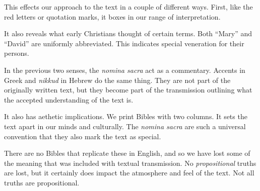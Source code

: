 \documentclass[aspectratio=169]{beamer}
\begin{document}
\begin{frame}
  This effects our approach to the text in a couple of different ways.
  First, like the red letters or quotation marks, it boxes in our range of interpretation.
\end{frame}

\begin{frame}
  It also reveals what early Christians thought of certain terms.
  Both ``Mary'' and ``David'' are uniformly abbreviated.
  This indicates special veneration for their persons.
\end{frame}

\begin{frame}
  In the previous two senses, the \emph{nomina sacra} act as a commentary.
  Accents in Greek and \emph{nikkud} in Hebrew do the same thing.
  They are not part of the originally written text, but they become part of the transmission outlining what the accepted understanding of the text is.
\end{frame}

\begin{frame}
  It also has aethetic implications.
  We print Bibles with two columns.
  It sets the text apart in our minds and culturally.
  The \emph{nomina sacra} are such a universal convention that they also mark the text as special.
\end{frame}

\begin{frame}
  There are no Bibles that replicate these in English, and so we have lost some of the meaning that was included with textual transmission.
  No \emph{propositional} truths are lost, but it certainly does impact the atmosphere and feel of the text.
  Not all truths are propositional.
\end{frame}
\end{document}
